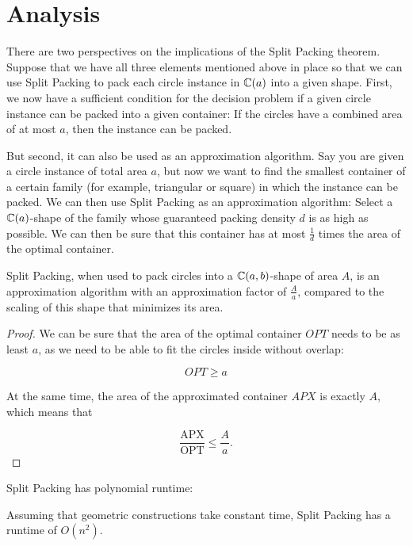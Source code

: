 \documentclass[a4paper,style=print,oneside,bibliography=totoc,nexus,lnum,extramargin]{tubsbook}
\begin{document}
\section{Analysis}

There are two perspectives on the implications of the Split Packing theorem. Suppose that we have all three elements mentioned above in place so that we can use Split Packing to pack each circle instance in $\mathbb{C}(a)$ into a given shape.
First, we now have a sufficient condition for the decision problem if a given circle instance can be packed into a given container: If the circles have a combined area of at most $a$, then the instance can be packed.

But second, it can also be used as an approximation algorithm. Say you are given a circle instance of total area $a$, but now we want to find the smallest container of a certain family (for example, triangular or square) in which the instance can be packed. We can then use Split Packing as an approximation algorithm: Select a $\mathbb{C}(a)$-shape of the family whose guaranteed packing density $d$ is as high as possible. We can then be sure that this container has at most $\frac{1}{d}$ times the area of the optimal container.

\begin{theorem}
    Split Packing, when used to pack circles into a $\mathbb{C}(a,b)$-shape of area $A$, is an approximation algorithm with an approximation factor of $\frac{A}{a}$, compared to the scaling of this shape that minimizes its area.
\end{theorem}

\begin{proof}
    We can be sure that the area of the optimal container $OPT$ needs to be as least $a$, as we need to be able to fit the circles inside without overlap:

    $$OPT \ge a$$

    At the same time, the area of the approximated container $APX$ is exactly $A$, which means that

    $$\frac{\text{APX}}{\text{OPT}} \le \frac{A}{a}.$$
\end{proof}

Split Packing has polynomial runtime:

\begin{theorem}
    Assuming that geometric constructions take constant time, Split Packing has a runtime of $O(n^2)$.
\end{theorem}
\end{document}
